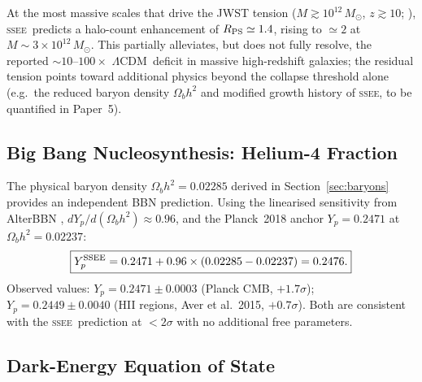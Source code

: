 \documentclass[12pt,a4paper]{article}
\newcommand{\SSEE}{\ifmmode\mathrm{SSEE}\else\textsc{ssee}\fi}
\newcommand{\LCDM}{\ifmmode\Lambda\mathrm{CDM}\else$\Lambda$CDM\fi}
\begin{document}
\noindent
At the most massive scales that drive the JWST tension
($M\gtrsim10^{12}\,M_\odot$, $z\gtrsim10$;
\citealt{Boylan-Kolchin2023}), \SSEE\ predicts a halo-count enhancement of
$R_{\rm PS}\simeq1.4$, rising to $\simeq2$ at $M\sim3\times10^{12}\,M_\odot$.
This partially alleviates, but does not fully resolve, the reported $\sim10$--$100\times$
\LCDM\ deficit in massive high-redshift galaxies; the
residual tension points toward additional physics beyond the collapse
threshold alone (e.g.\ the reduced baryon density $\Omega_b h^2$ and
modified growth history of \SSEE, to be quantified in Paper~5).

\subsection{Big Bang Nucleosynthesis: Helium-4 Fraction}
\label{sec:bbn}

The physical baryon density $\Omega_b h^2 = 0.02285$ derived in
Section~\ref{sec:baryons} provides an independent BBN prediction.
Using the linearised sensitivity from AlterBBN \citep{Pisanti2008},
$dY_p/d(\Omega_b h^2) \approx 0.96$, and the Planck~2018 anchor
$Y_p = 0.2471$ at $\Omega_b h^2 = 0.02237$:
\begin{equation}
\boxed{Y_p^{\rm SSEE} = 0.2471 + 0.96\times(0.02285-0.02237) = 0.2476.}
\label{eq:yp}
\end{equation}
Observed values: $Y_p = 0.2471\pm0.0003$ (Planck CMB, $+1.7\sigma$);
$Y_p = 0.2449\pm0.0040$ (HII regions, Aver et al.\ 2015, $+0.7\sigma$).
Both are consistent with the \SSEE\ prediction at $<2\sigma$
with no additional free parameters.

\subsection{Dark-Energy Equation of State}
\label{sec:w0wa}
\end{document}

